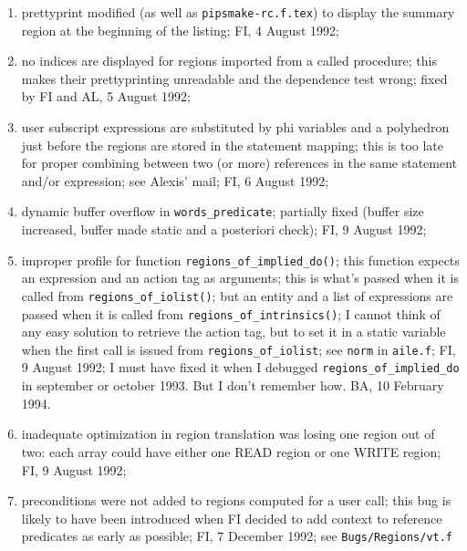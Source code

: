 \begin{enumerate}
  \item prettyprint modified (as well as \verb+pipsmake-rc.f.tex+) 
        to display the summary region at the beginning of the listing;
        FI, 4 August 1992;

  \item no indices are displayed for regions imported from a called
        procedure; this makes their prettyprinting unreadable and
        the dependence test wrong; fixed by FI and AL, 5 August 1992;

  \item user subscript expressions are substituted by phi variables
        and a polyhedron just before the regions are stored in the
        statement mapping; this is too late for proper combining
        between two (or more) references in the same statement and/or
        expression; see Alexis' mail; FI, 6 August 1992;

  \item dynamic buffer overflow in \verb+words_predicate+; partially
        fixed (buffer size increased, buffer made static and a
        posteriori check); FI, 9 August 1992;

  \item improper profile for function \verb+regions_of_implied_do()+;
        this function expects an expression and an action tag as
        arguments; this is what's passed when it is called from
        \verb+regions_of_iolist()+; but an entity and a list of
        expressions are passed when it is called from 
        \verb+regions_of_intrinsics()+; I cannot think of any easy
        solution to retrieve the action tag, but to set it in a static
        variable when the first call is issued from \verb+regions_of_iolist+;
        see \verb+norm+ in \verb+aile.f+; FI, 9 August 1992;
        I must have fixed it when I debugged {\tt regions\_of\_implied\_do} in
        september or october 1993. But I don't remember how. 
        BA, 10 February 1994.

  \item inadequate optimization in region translation was losing one
        region out of two: each array could have either one READ region
        or one WRITE region; FI, 9 August 1992;

  \item preconditions were not added to regions computed for a user
        call; this bug is likely to have been introduced when FI
        decided to add context to reference predicates as early
        as possible; FI, 7 December 1992; see \verb+Bugs/Regions/vt.f+


\end{enumerate}
